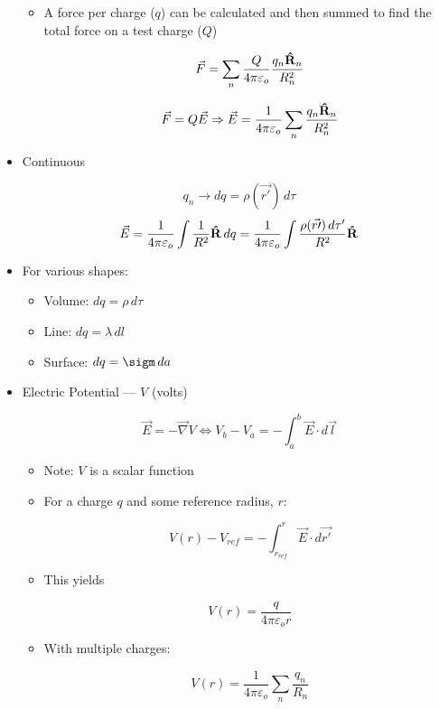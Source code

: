 \begin{itemize}
\begin{itemize}
      \item A force per charge  ($q$) can be calculated and then summed to find the total force on a test charge ($Q$)

        $$\vec{F}=\sum_n\frac{Q}{4\pi\varepsilon_o}\frac{q_n\bold{\hat{R}}_n}{R_n^2}$$

        $$\vec{F}=Q\vec{E}\Rightarrow \vec{E}=\frac{1}{4\pi\varepsilon_o}\sum_n\frac{q_n\bold{\hat{R}}_n}{R_n^2}$$

    \end{itemize}

  \item Continuous

    $$q_n\rightarrow dq=\rho(\vec{r\prime})\,d\tau$$
    $$\vec{E}=\frac{1}{4\pi\varepsilon_o}\int\frac{1}{R^2}\bold{\hat{R}}\,dq=\frac{1}{4\pi\varepsilon_o}\int \frac{\rho(\vec{r\prime})\,d\tau'}{R^2}\bold{\hat{R}}$$

  \item For various shapes:

    \begin{itemize}

      \item Volume: $dq=\rho\,d\tau$

      \item Line: $dq=\lambda\,dl$

      \item Surface: $dq=\sigm\,da$

    \end{itemize}

  \item Electric Potential — $V$ (volts)

      $$\vec{E}=-\vec{\nabla}V \Longleftrightarrow V_b-V_a=-\int_a^b \vec{E}\cdot d\vec{l}$$

    \begin{itemize}

      \item Note: $V$ is a scalar function

      \item For a charge $q$ and some reference radius, $r$:

        $$V(r)-V_{ref}=-\int_{r_{ref}}^r \vec{E}\cdot d\vec{r\prime}$$

      \item This yields

        $$V(r)=\frac{q}{4\pi\varepsilon_o r}$$

      \item With multiple charges:

        $$V(r)=\frac{1}{4\pi\varepsilon_o}\sum_n\frac{q_n}{R_n}$$

    \end{itemize}

\end{itemize}




